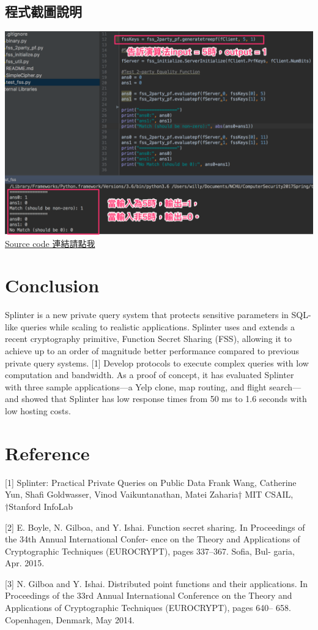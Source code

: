 \documentclass[12pt,a4paper]{article}
\begin{document}
\begin{multicols}{2}
\subsection{程式截圖說明}
\includegraphics[scale=0.25]{程式截圖說明.png}
\href{https://github.com/WillyWu0201/ComputerSecurity2017Spring}{Source code 連結請點我}

\section{Conclusion}
Splinter is a new private query system that protects sensitive parameters in SQL-like queries while scaling to realistic applications. Splinter uses and extends a recent cryptography primitive, Function Secret Sharing (FSS), allowing it to achieve up to an order of magnitude better performance compared to previous private query systems. [1] Develop protocols to execute complex queries with low computation and bandwidth. As a proof of concept, it has evaluated Splinter with three sample applications—a Yelp clone, map routing, and flight search—and showed that Splinter has low response times from 50 ms to 1.6 seconds with low hosting costs.

\section{Reference}
[1] Splinter: Practical Private Queries on Public 
Data Frank Wang, Catherine Yun, Shafi Goldwasser, 
Vinod Vaikuntanathan, Matei Zaharia† MIT CSAIL, 
†Stanford InfoLab

[2] E. Boyle, N. Gilboa, and Y. Ishai. Function 
secret sharing. In Proceedings of the 34th Annual 
International Confer- ence on the Theory and 
Applications of Cryptographic Techniques 
(EUROCRYPT), pages 337–367. Sofia, Bul- garia, Apr. 
2015.

[3] N. Gilboa and Y. Ishai. Distributed point 
functions and their applications. In Proceedings of 
the 33rd Annual International Conference on the 
Theory and Applications of Cryptographic Techniques 
(EUROCRYPT), pages 640– 658. Copenhagen, Denmark, 
May 2014.
\end{multicols}
\end{document}
